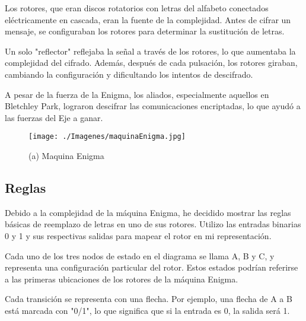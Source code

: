 \documentclass{article}
\begin{document}
    \vspace{\baselineskip} %
    Los rotores, que eran discos rotatorios con letras del alfabeto conectados eléctricamente en cascada, eran la fuente de la complejidad. Antes de cifrar un mensaje, se configuraban los rotores para determinar la sustitución de letras.

    \vspace{\baselineskip} %
    Un solo "reflector" reflejaba la señal a través de los rotores, lo que aumentaba la complejidad del cifrado. Además, después de cada pulsación, los rotores giraban, cambiando la configuración y dificultando los intentos de descifrado.

    
    \vspace{\baselineskip} %
    A pesar de la fuerza de la Enigma, los aliados, especialmente aquellos en Bletchley Park, lograron descifrar las comunicaciones encriptadas, lo que ayudó a las fuerzas del Eje a ganar.
    

    \begin{figure}[!h]
        \centering
        \texttt{[image: ./Imagenes/maquinaEnigma.jpg]}
        \caption*{(a) Maquina Enigma}
    \end{figure}
    
    \newpage

    \subsection{Reglas}
    Debido a la complejidad de la máquina Enigma, he decidido mostrar las reglas básicas de reemplazo de letras en uno de sus rotores. Utilizo las entradas binarias 0 y 1 y sus respectivas salidas para mapear el rotor en mi representación.

    \vspace{\baselineskip} %

    Cada uno de los tres nodos de estado en el diagrama se llama A, B y C, y representa una configuración particular del rotor. Estos estados podrían referirse a las primeras ubicaciones de los rotores de la máquina Enigma.
    \vspace{\baselineskip} %

    Cada transición se representa con una flecha. Por ejemplo, una flecha de A a B está marcada con "0/1", lo que significa que si la entrada es 0, la salida será 1.
    \vspace{\baselineskip} %
\end{document}
